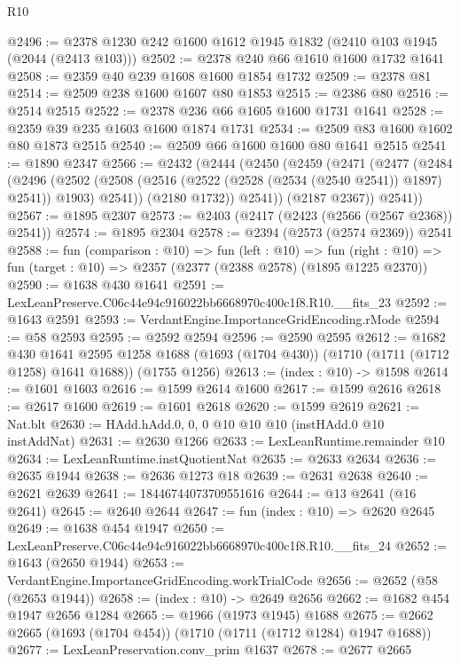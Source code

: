 \begin{lexlean}{R10}
\begin{coremodule}
@2496 := @2378 @1230 @242 @1600 @1612 @1945 @1832 (@2410 @103 @1945 (@2044 (@2413 @103)))
@2502 := @2378 @240 @66 @1610 @1600 @1732 @1641
@2508 := @2359 @40 @239 @1608 @1600 @1854 @1732
@2509 := @2378 @81
@2514 := @2509 @238 @1600 @1607 @80 @1853
@2515 := @2386 @80
@2516 := @2514 @2515
@2522 := @2378 @236 @66 @1605 @1600 @1731 @1641
@2528 := @2359 @39 @235 @1603 @1600 @1874 @1731
@2534 := @2509 @83 @1600 @1602 @80 @1873 @2515
@2540 := @2509 @66 @1600 @1600 @80 @1641 @2515
@2541 := @1890 @2347
@2566 := @2432
    (@2444
      (@2450
        (@2459
          (@2471
            (@2477
              (@2484
                (@2496
                  (@2502
                    (@2508 (@2516 (@2522 (@2528 (@2534 (@2540 @2541)) @1897) @2541)) @1903)
                    @2541))
                (@2180 @1732))
              @2541))
          (@2187 @2367))
        @2541))
@2567 := @1895 @2307
@2573 := @2403 (@2417 (@2423 (@2566 (@2567 @2368)) @2541))
@2574 := @1895 @2304
@2578 := @2394 (@2573 (@2574 @2369)) @2541
@2588 := fun (comparison : @10) =>
  fun (left : @10) =>
  fun (right : @10) => fun (target : @10) => @2357 (@2377 (@2388 @2578) (@1895 @1225 @2370))
@2590 := @1638 @430 @1641
@2591 := LexLeanPreserve.C06c44e94c916022bb6668970c400c1f8.R10.__fits_23
@2592 := @1643 @2591
@2593 := VerdantEngine.ImportanceGridEncoding.rMode
@2594 := @58 @2593
@2595 := @2592 @2594
@2596 := @2590 @2595
@2612 := @1682
    @430
    @1641
    @2595
    @1258
    @1688
    (@1693 (@1704 @430))
    (@1710 (@1711 (@1712 @1258) @1641 @1688))
    (@1755 @1256)
@2613 := (index : @10) -> @1598
@2614 := @1601 @1603
@2616 := @1599 @2614 @1600
@2617 := @1599 @2616
@2618 := @2617 @1600
@2619 := @1601 @2618
@2620 := @1599 @2619
@2621 := Nat.blt
@2630 := HAdd.hAdd.{0, 0, 0} @10 @10 @10 (instHAdd.{0} @10 instAddNat)
@2631 := @2630 @1266
@2633 := LexLeanRuntime.remainder @10
@2634 := LexLeanRuntime.instQuotientNat
@2635 := @2633 @2634
@2636 := @2635 @1944
@2638 := @2636 @1273 @18
@2639 := @2631 @2638
@2640 := @2621 @2639
@2641 := 18446744073709551616
@2644 := @13 @2641 (@16 @2641)
@2645 := @2640 @2644
@2647 := fun (index : @10) => @2620 @2645
@2649 := @1638 @454 @1947
@2650 := LexLeanPreserve.C06c44e94c916022bb6668970c400c1f8.R10.__fits_24
@2652 := @1643 (@2650 @1944)
@2653 := VerdantEngine.ImportanceGridEncoding.workTrialCode
@2656 := @2652 (@58 (@2653 @1944))
@2658 := (index : @10) -> @2649 @2656
@2662 := @1682 @454 @1947 @2656 @1284
@2665 := @1966 (@1973 @1945) @1688
@2675 := @2662 @2665 (@1693 (@1704 @454)) (@1710 (@1711 (@1712 @1284) @1947 @1688))
@2677 := LexLeanPreservation.conv_prim @1637
@2678 := @2677 @2665

\end{coremodule}
\end{lexlean}
